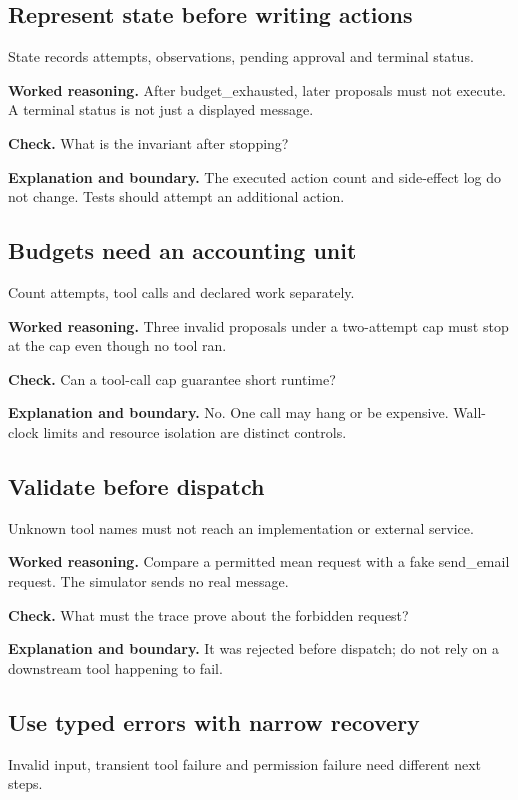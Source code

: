 \subsection{Represent state before writing actions}
State records attempts, observations, pending approval and terminal status.

\textbf{Worked reasoning.} After budget\_exhausted, later proposals must not execute. A terminal status is not just a displayed message.

\textbf{Check.} What is the invariant after stopping?

\textbf{Explanation and boundary.} The executed action count and side-effect log do not change. Tests should attempt an additional action.

\subsection{Budgets need an accounting unit}
Count attempts, tool calls and declared work separately.

\textbf{Worked reasoning.} Three invalid proposals under a two-attempt cap must stop at the cap even though no tool ran.

\textbf{Check.} Can a tool-call cap guarantee short runtime?

\textbf{Explanation and boundary.} No. One call may hang or be expensive. Wall-clock limits and resource isolation are distinct controls.

\subsection{Validate before dispatch}
Unknown tool names must not reach an implementation or external service.

\textbf{Worked reasoning.} Compare a permitted mean request with a fake send\_email request. The simulator sends no real message.

\textbf{Check.} What must the trace prove about the forbidden request?

\textbf{Explanation and boundary.} It was rejected before dispatch; do not rely on a downstream tool happening to fail.

\subsection{Use typed errors with narrow recovery}
Invalid input, transient tool failure and permission failure need different next steps.

